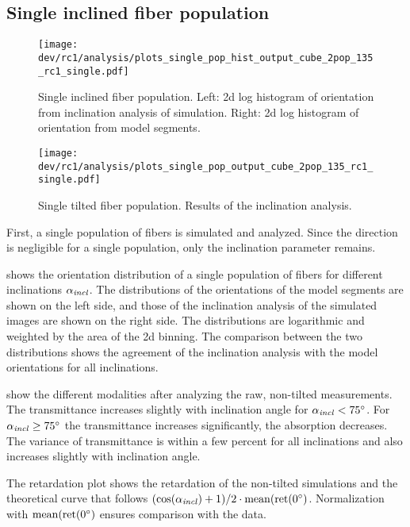 \subsection{Single inclined fiber population}
\label{sec:resSingleIncl}
%
\begin{figure}[!t]
\centering
\texttt{[image: dev/rc1/analysis/plots\_single\_pop\_hist\_output\_cube\_2pop\_135\_rc1\_single.pdf]}
\caption{Single inclined fiber population. Left: 2d log histogram of orientation from inclination analysis of simulation. Right: 2d log histogram of orientation from model segments.}
\label{fig:single_fiber_pop_hist}
\end{figure}
%
\begin{figure}[!p]
\centering
\texttt{[image: dev/rc1/analysis/plots\_single\_pop\_output\_cube\_2pop\_135\_rc1\_single.pdf]}
\caption{Single tilted fiber population. Results of the inclination analysis.}
\label{fig:single_fiber_pop_rofl}
\end{figure}
%
First, a single population of fibers is simulated and analyzed.
Since the direction is negligible for a single population, only the inclination parameter \modelInc{} remains.
\par
%
 shows the orientation distribution of a single population of fibers for different inclinations $\textnormal{$\alpha_{\mathit{incl}}$}{}$.
The distributions of the orientations of the model segments are shown on the left side, and those of the inclination analysis of the simulated images are shown on the right side.
The distributions are logarithmic and weighted by the area of the 2d binning.
The comparison between the two distributions shows the agreement of the inclination analysis with the model orientations for all inclinations.
\par
%
 show the different modalities after analyzing the raw, non-tilted measurements.
The transmittance increases slightly with inclination angle for $\textnormal{$\alpha_{\mathit{incl}}$}<\SI{75}{\degree}$.
For $\textnormal{$\alpha_{\mathit{incl}}$} \ge \SI{75}{\degree}$ the transmittance increases significantly, \ie{} the absorption decreases.
The variance of transmittance is within a few percent for all inclinations and also increases slightly with inclination angle.
\par
%
The retardation plot shows the retardation of the non-tilted simulations and the theoretical curve that follows $(\cos(\textnormal{$\alpha_{\mathit{incl}}$}) + 1) / 2 \cdot \mathrm{mean}(\mathrm{ret}(\SI{0}{\degree})$.
Normalization with $\mathrm{mean}(\mathrm{ret}(\SI{0}{\degree})$ ensures comparison with the data.
